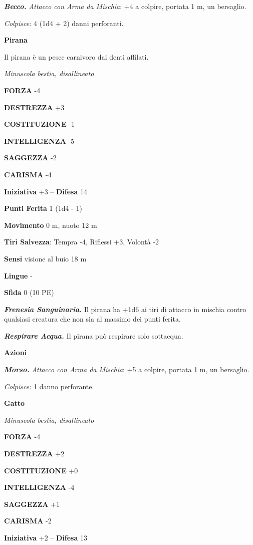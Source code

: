 \begin{multicols}{2}
\emph{\textbf{Becco.} Attacco con Arma da Mischia}: +4 a colpire, portata 1 m, un bersaglio.

\emph{Colpisce:} 4 (1d4 + 2) danni perforanti.

\medskip\textbf{Pirana}

Il pirana è un pesce carnivoro dai denti affilati.

\emph{Minuscola bestia, disallineato}

\textbf{FORZA} -4

\textbf{DESTREZZA} +3

\textbf{COSTITUZIONE} -1

\textbf{INTELLIGENZA} -5

\textbf{SAGGEZZA} -2

\textbf{CARISMA} -4

\textbf{Iniziativa} +3 -- \textbf{Difesa} 14

\textbf{Punti Ferita} 1 (1d4 - 1)

\textbf{Movimento} 0 m, nuoto 12 m

\textbf{Tiri Salvezza}: Tempra -4, Riflessi +3, Volontà -2 

\textbf{Sensi} visione al buio 18 m

\textbf{Lingue} -

\textbf{Sfida} 0 (10 PE)

\emph{\textbf{Frenesia Sanguinaria.}} Il pirana ha +1d6 ai tiri di attacco in mischia contro qualsiasi creatura che non sia al massimo dei punti ferita.

\emph{\textbf{Respirare Acqua.}} Il pirana può respirare solo sottacqua. 

\textbf{Azioni}

\emph{\textbf{Morso.} Attacco con Arma da Mischia}: +5 a colpire, portata 1 m, un bersaglio.

\emph{Colpisce:} 1 danno perforante.

\medskip\textbf{Gatto}

\emph{Minuscola bestia, disallineato}

\textbf{FORZA} -4

\textbf{DESTREZZA} +2

\textbf{COSTITUZIONE} +0

\textbf{INTELLIGENZA} -4

\textbf{SAGGEZZA} +1

\textbf{CARISMA} -2

\textbf{Iniziativa} +2 -- \textbf{Difesa} 13


\end{multicols}
